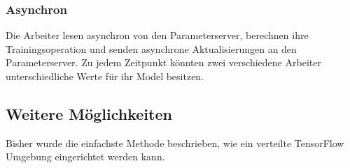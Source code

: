 \subsubsection{Asynchron}
Die Arbeiter lesen asynchron von den Parameterserver, berechnen ihre Trainingsoperation und senden asynchrone Aktualisierungen an den Parameterserver. Zu jedem Zeitpunkt könnten zwei verschiedene Arbeiter unterschiedliche Werte für ihr Model besitzen.

\subsection{Weitere Möglichkeiten}
Bisher wurde die einfachste Methode beschrieben, wie ein verteilte TensorFlow Umgebung eingerichtet werden kann. 




